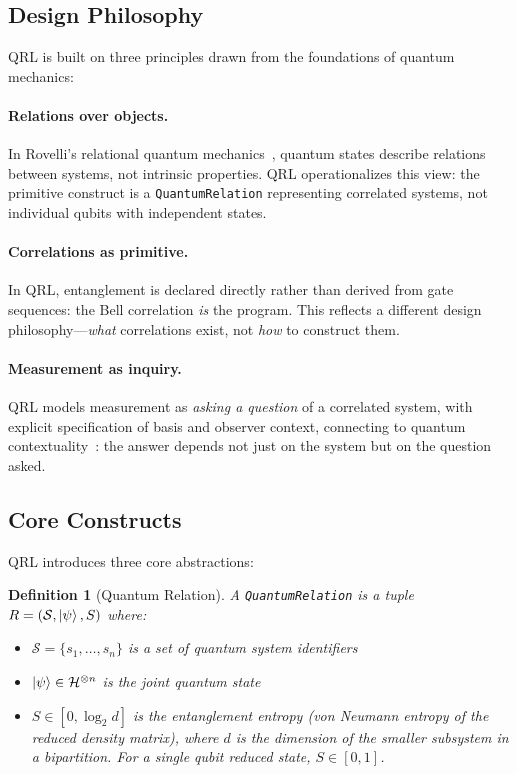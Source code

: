 \documentclass[submission,copyright,creativecommons]{eptcs}
\newtheorem{definition}{Definition}
\newcommand{\qrl}{\textsc{QRL}}
\begin{document}
\subsection{Design Philosophy}

\qrl{} is built on three principles drawn from the foundations of quantum mechanics:

\paragraph{Relations over objects.}
In Rovelli's relational quantum mechanics~\cite{rovelli1996}, quantum states
describe relations between systems, not intrinsic properties.
\qrl{} operationalizes this view: the primitive construct is a
\texttt{QuantumRelation} representing correlated systems, not individual
qubits with independent states.

\paragraph{Correlations as primitive.}
In \qrl{}, entanglement is declared directly rather than derived from gate
sequences: the Bell correlation \emph{is} the program. This reflects a
different design philosophy---\emph{what} correlations exist, not \emph{how}
to construct them.

\paragraph{Measurement as inquiry.}
\qrl{} models measurement as \emph{asking a question} of a correlated system,
with explicit specification of basis and observer context, connecting to
quantum contextuality~\cite{coecke2017}: the answer depends not just on the
system but on the question asked.

\subsection{Core Constructs}

\qrl{} introduces three core abstractions:

\begin{definition}[Quantum Relation]
A \texttt{QuantumRelation} is a tuple $R = (\mathcal{S}, \ket{\psi}, S)$ where:
\begin{itemize}
    \item $\mathcal{S} = \{s_1, \ldots, s_n\}$ is a set of quantum system identifiers
    \item $\ket{\psi} \in \mathcal{H}^{\otimes n}$ is the joint quantum state
    \item $S \in [0, \log_2 d]$ is the entanglement entropy (von Neumann entropy
          of the reduced density matrix), where $d$ is the dimension of the
          smaller subsystem in a bipartition. For a single qubit reduced state,
          $S \in [0, 1]$.
\end{itemize}
\end{definition}
\end{document}
